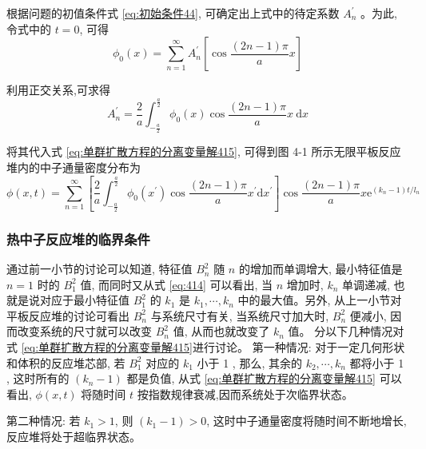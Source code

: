 \documentclass{Sichuan Normal University}
\begin{document}
根据问题的初值条件式 \eqref{eq:初始条件44}, 可确定出上式中的待定系数 $A_n^{\prime}$ 。为此, 令式中的 $t=0$, 可得
\begin{equation}
\phi_0(x)=\sum_{n=1}^{\infty} A_n^{\prime}\left[\cos \frac{(2 n-1) \pi}{a} x\right]
\end{equation}

利用正交关系,可求得
\begin{equation}
A_n^{\prime}=\frac{2}{a} \int_{-\frac{a}{2}}^{\frac{a}{2}} \phi_0(x) \cos \frac{(2 n-1) \pi}{a} x \mathrm{~d} x
\end{equation}

将其代入式 \eqref{eq:单群扩散方程的分离变量解415}, 可得到图 4-1 所示无限平板反应堆内的中子通量密度分布为
\begin{equation}
\phi(x, t)=\sum_{n=1}^{\infty}\left[\frac{2}{a} \int_{-\frac{a}{2}}^{\frac{a}{2}} \phi_0\left(x^{\prime}\right) \cos \frac{(2 n-1) \pi}{a} x^{\prime} \mathrm{d} x^{\prime}\right] \cos \frac{(2 n-1) \pi}{a} x \mathrm{e}^{\left(k_n-1\right) t / l_n}
\end{equation}
\subsubsection*{热中子反应堆的临界条件}

通过前一小节的讨论可以知道, 特征值 $B_n^2$ 随 $n$ 的增加而单调增大, 最小特征值是 $n=1$ 时的 $B_1^2$ 值, 而同时又从式 \eqref{eq:414} 可以看出, 当 $n$ 增加时, $k_n$ 单调递减, 也就是说对应于最小特征值 $B_1^2$ 的 $k_1$ 是 $k_1, \cdots, k_n$ 中的最大值。另外, 从上一小节对平板反应堆的讨论可看出 $B_n^2$ 与系统尺寸有关, 当系统尺寸加大时, $B_n^2$ 便减小, 因而改变系统的尺寸就可以改变 $B_n^2$ 值, 从而也就改变了 $k_n$ 值。
分以下几种情况对式 \eqref{eq:单群扩散方程的分离变量解415}进行讨论。
第一种情况: 对于一定几何形状和体积的反应堆芯部, 若 $B_1^2$ 对应的 $k_1$ 小于 1 , 那么, 其余的 $k_2, \cdots, k_n$ 都将小于 1 , 这时所有的 $\left(k_n-1\right)$ 都是负值, 从式 \eqref{eq:单群扩散方程的分离变量解415} 可以看出, $\phi(x, t)$ 将随时间 $t$ 按指数规律衰减,因而系统处于次临界状态。

第二种情况: 若 $k_1>1$, 则 $\left(k_1-1\right)>0$, 这时中子通量密度将随时间不断地增长, 反应堆将处于超临界状态。
\end{document}
